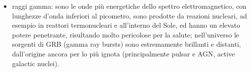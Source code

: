 \documentclass[]{article}
\begin{document}
\begin{itemize}
	\item raggi gamma: sono le onde più energetiche dello spettro elettromagnetico, con lunghezze d'onda inferiori al picometro, sono prodotte da reazioni nucleari, ad esempio in reattori termonucleari e all'interno del Sole, ed hanno un elevato potere penetrante, risultando molto pericolose per la salute; nell'universo le sorgenti di GRB (gamma ray bursts) sono estremamente brillanti e distanti, dall'origine ancora per lo più ignota (principalmente pulsar e AGN, active galactic nuclei).
\end{itemize}
\end{document}
